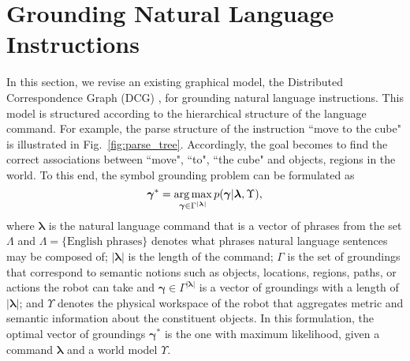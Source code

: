 \section{Grounding Natural Language Instructions}
\label{sec:background}
In this section, we revise an existing graphical model, the Distributed Correspondence Graph (DCG) \cite{dcg}, for grounding natural language instructions. This model is structured according to the hierarchical structure of the language command. For example, the parse structure of the instruction ``move to the cube" is illustrated in Fig.~\ref{fig:parse_tree}. Accordingly, the goal becomes to find the correct associations between ``move", ``to", ``the cube" and objects, regions in the world. To this end, 
the symbol grounding problem can be formulated as
\begin{equation}
\boldsymbol{\gamma}^* = \operatorname*{\arg\max}_{\boldsymbol{\gamma} \in \Gamma^{|\boldsymbol{\lambda}|}} p(\boldsymbol{\gamma}|\boldsymbol{\lambda},\Upsilon),
\label{eq:max_ground_prob}
\end{equation}
where $\boldsymbol{\lambda}$ is the natural language command that is a vector of phrases from the set $\Lambda$ and ${\Lambda = \{\text{English phrases}\}}$ denotes what phrases natural language sentences may be composed of; $|\boldsymbol{\lambda}|$ is the length of the command; ${\Gamma}$ is the set of groundings that correspond to semantic notions such as objects, locations, regions, paths, or actions the robot can take and $\boldsymbol{\gamma} \in \Gamma^{|\boldsymbol{\lambda}|}$ is a vector of groundings with a length of $|\boldsymbol{\lambda}|$; and $\Upsilon$ denotes the physical workspace of the robot that aggregates metric and semantic information about the constituent objects. In this formulation, the optimal vector of groundings $\boldsymbol{\gamma}^*$ is the one with maximum likelihood, given a command $\boldsymbol{\lambda}$ and a world model $\Upsilon$.



